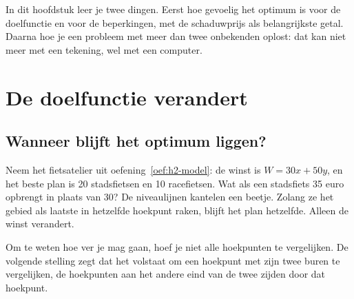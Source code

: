 In dit hoofdstuk leer je twee dingen. Eerst hoe gevoelig het optimum is voor de doelfunctie en voor de beperkingen, met de schaduwprijs als belangrijkste getal. Daarna hoe je een probleem met meer dan twee onbekenden oplost: dat kan niet meer met een tekening, wel met een computer.

\begin{oefeningen}[Start]

\end{oefeningen}


\section{De doelfunctie verandert}

\subsection{Wanneer blijft het optimum liggen?}

Neem het fietsatelier uit oefening~\ref{oef:h2-model}: de winst is $W = 30x + 50y$, en het beste plan is 20 stadsfietsen en 10 racefietsen. Wat als een stadsfiets 35 euro opbrengt in plaats van 30? De niveaulijnen kantelen een beetje. Zolang ze het gebied als laatste in hetzelfde hoekpunt raken, blijft het plan hetzelfde. Alleen de winst verandert.

Om te weten hoe ver je mag gaan, hoef je niet alle hoekpunten te vergelijken. De volgende stelling zegt dat het volstaat om een hoekpunt met zijn twee buren te vergelijken, de hoekpunten aan het andere eind van de twee zijden door dat hoekpunt.


